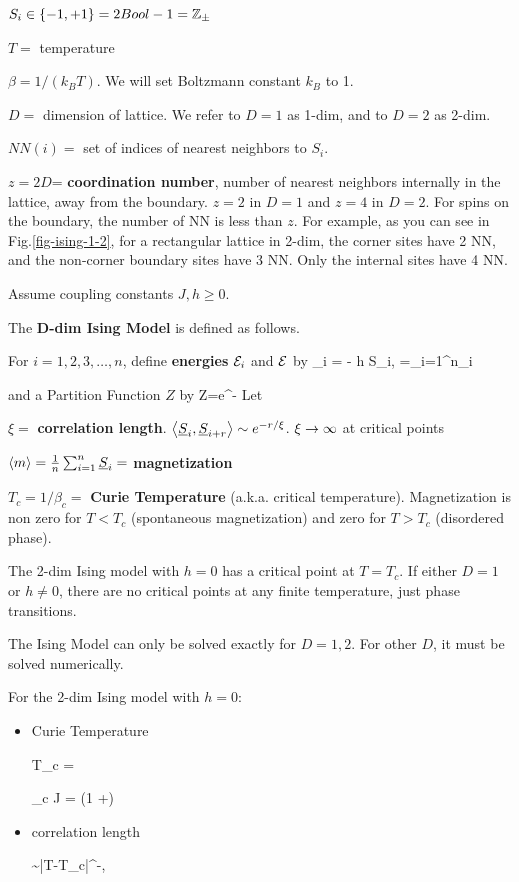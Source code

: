  
$S_i\in \{-1, +1\} =2 Bool-1={\mathbb{Z}}_\pm$

$T=$ temperature

$
\beta = 1/(k_B T)
$. We will set Boltzmann constant $k_B$  to 1.

$D=$ dimension of lattice. We refer to $D=1$ as 1-dim, and to $D=2$ as 2-dim.

$NN(i)=$ set of indices of nearest neighbors 
to $S_i$.

$z=2D$= {\bf coordination number},
number of nearest neighbors
internally in the lattice, away from the boundary. 
$z=2$ in $D=1$ and $z=4$ in $D=2$.
For spins on the boundary, the number of NN
is less than $z$. For example, as you 
can see in Fig.\ref{fig-ising-1-2}, for a rectangular lattice 
in 2-dim, the corner sites have 2 NN, and the non-corner
boundary sites have 3 NN. Only the internal sites have 4 NN.

Assume coupling constants $J, h\geq 0$.

The {\bf D-dim Ising Model} is defined as follows.

For $i=1, 2,3, \ldots, n$, 
define {\bf energies} ${\cal E}_i$ and ${\cal E}$ by
\beq
\cale_i = - h S_{i},
\quad
\cale=\sum_{i=1}^n\cale_i
\eeq

and a 
Partition Function $Z$ by
\beq
Z=\left[\prod_{i=1}^n\sum_{S_i\in\ZZ_\pm}
\right]
e^{-\beta \cale}
\eeq
Let

$\xi=$ {\bf correlation length}. $\av{\rvS_i, \rvS_{i+r}}\sim e^{-r/\xi}$. $\xi\rightarrow \infty$ at critical points

$\av{m}=\frac{1}{n}\sum_{i=1}^n\rvS_i=$ {\bf magnetization}

$T_c= 1/\beta_c=$ {\bf Curie Temperature} (a.k.a. critical temperature). Magnetization is non zero for $T< T_c$ (spontaneous magnetization) and zero for $T>T_c$ (disordered phase).

The 2-dim Ising model with $h=0$ has a critical
point at $T=T_c$.
If either $D=1$ or $h\neq 0$,
 there are no critical 
points at any finite temperature, just phase transitions.



The Ising Model can only be solved
exactly for $D=1, 2$. 
For other $D$, it must be solved numerically.

For the 2-dim Ising model with $h=0$:

\begin{itemize}
\item Curie Temperature

  \beq
  T_c = 
  \eeq

\beq
\beta_c J = \ln(1 +)
\eeq

\item correlation length

\beq
\xi \sim |T-T_c|^{-\nu},\quad {}
\eeq


\end{itemize}












